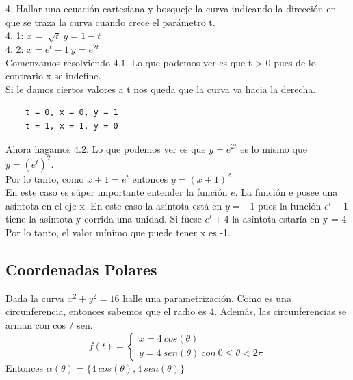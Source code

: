 \documentclass[10pt,a4paper]{article}
\begin{document}
4. Hallar una ecuación cartesiana y bosqueje la curva indicando la dirección en que se traza la curva cuando crece el parámetro t. \\
4. 1: $x = \sqrt[]{t} \ y = 1 - t$ \\
4. 2: $x = e^{t} -1 \ y = e^{2t}$ \\
Comenzamos resolviendo $4.1$. Lo que podemos ver es que t > 0 pues de lo contrario x se indefine. \\
Si le damos ciertos valores a t nos queda que la curva va hacia la derecha.
\begin{lstlisting}
    t = 0, x = 0, y = 1
    t = 1, x = 1, y = 0
\end{lstlisting}
Ahora hagamos $4.2$. Lo que podemos ver es que $y = e^{2t}$ es lo mismo que $y = (e^{t})^{2}$. \\
Por lo tanto, como $x + 1 = e^{t}$ entonces $ y = (x+1)^{2}$ \\
En este caso es súper importante entender la función $e$. La función e posee una asíntota en el eje x. En este caso la asíntota está en $y = -1$ pues la función $e^{t} - 1$ tiene la asíntota y corrida una unidad. Si fuese $e^{t} + 4$ la asíntota estaría en y = 4  \\
Por lo tanto, el valor mínimo que puede tener x es -1.
\subsection*{Coordenadas Polares}
Dada la curva $x^{2} + y^{2} = 16$ halle una parametrización. Como es una circunferencia, entonces sabemos que el radio es $4$. Además, las circunferencias se arman con cos / sen. 
\[
f(t) =
\begin{cases} 
x = 4 \ cos(\theta) \\
y = 4 \ sen(\theta) \ con \ 0\le \theta < 2\pi
\end{cases}
\]
Entonces $\alpha(\theta) = \{4 \ cos(\theta), 4 \ sen(\theta)\}$
\end{document}

